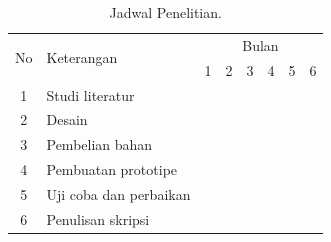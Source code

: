 		\begin{table}[ht!]
		\centering
		\caption{Jadwal Penelitian.}
		\label{jadwal}
		\begin{tabular}{|c|l|l|l|l|l|l|l|}
		\hline
		\multirow{2}{*}{No} & \multirow{2}{*}{Keterangan} & \multicolumn{6}{c|}{Bulan}                                                                                                                          \\ \cline{3-8} 
		                    &                             & 1 & 2 & 3 & 4 & 5 & 6 \\ \hline
		1                   & Studi literatur                                  &\cellcolor{gray} &\cellcolor{gray}&                        &                        &                        &                         \\ \hline
		2                   & Desain                                           &                        &\cellcolor{gray}&\cellcolor{gray}&                        &                        &                         \\ \hline
		3                   & Pembelian bahan                                  &                        &                        &\cellcolor{gray}&                        &                        &                         \\ \hline
		4                   & Pembuatan prototipe                              &                        &                        &\cellcolor{gray}&\cellcolor{gray}&\cellcolor{gray}&                         \\ \hline
		5                   & Uji coba dan perbaikan                           &                        &                        &                        &\cellcolor{gray}&\cellcolor{gray}&                         \\ \hline
		6                   & Penulisan skripsi                                &                        &                        &                        &                        &                        &\cellcolor{gray}\\ \hline
		\end{tabular}
		\end{table}
	


